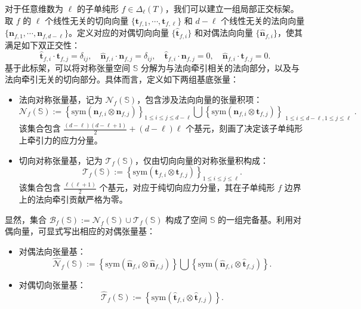 对于任意维数为 $\ell$ 的子单纯形 $f \in \Delta_{\ell}(T)$，我们可以建立一组局部正交标架。取 $f$ 的 $\ell$ 个线性无关的切向向量 $\{\boldsymbol{t}_{f,1}, \cdots, \boldsymbol{t}_{f,\ell}\}$ 和 $d-\ell$ 个线性无关的法向向量 $\{\boldsymbol{n}_{f,1}, \cdots, \boldsymbol{n}_{f,d-\ell}\}$。定义对应的对偶切向向量 $\{\hat{\boldsymbol{t}}_{f,i}\}$ 和对偶法向向量 $\{\hat{\boldsymbol{n}}_{f,i}\}$，使其满足如下双正交性：
\[
\hat{\boldsymbol{t}}_{f, i} \cdot \boldsymbol{t}_{f, j} = \delta_{ij}, \quad \hat{\boldsymbol{n}}_{f, i} \cdot \boldsymbol{n}_{f, j} = \delta_{ij}, \quad \hat{\boldsymbol{t}}_{f, i} \cdot \boldsymbol{n}_{f, j} = 0, \quad \hat{\boldsymbol{n}}_{f, i} \cdot \boldsymbol{t}_{f, j} = 0.
\]
基于此标架，可以将对称张量空间 $\mathbb{S}$ 分解为与法向牵引相关的法向部分，以及与法向牵引无关的切向部分。具体而言，定义如下两组基底张量：
\begin{itemize}
	\item 法向对称张量基，记为 $\mathcal{N}_f(\mathbb{S})$，包含涉及法向向量的张量积项：
	\[
	\mathcal{N}_f(\mathbb{S}) := \left\{ \mathrm{sym}(\boldsymbol{n}_{f, i} \otimes \boldsymbol{n}_{f, j}) \right\}_{1 \leq i \leq j \leq d-\ell} \bigcup \left\{ \mathrm{sym}(\boldsymbol{n}_{f, i} \otimes \boldsymbol{t}_{f, j}) \right\}_{\substack{1 \leq i \leq d-\ell,1 \leq j \leq \ell}}.
	\]
	该集合包含 $\frac{(d-\ell)(d-\ell+1)}{2} + (d-\ell)\ell$ 个基元，刻画了决定该子单纯形上牵引力的应力分量。
	
	\item 切向对称张量基，记为 $\mathcal{T}_f(\mathbb{S})$，仅由切向向量的对称张量积构成：
	\[
	\mathcal{T}_f(\mathbb{S}) := \left\{ \mathrm{sym}(\boldsymbol{t}_{f, i} \otimes \boldsymbol{t}_{f, j}) \right\}_{1 \leq i \leq j \leq \ell}.
	\]
	该集合包含 $\frac{\ell(\ell+1)}{2}$ 个基元，对应于纯切向应力分量，其在子单纯形 $f$ 边界上的法向牵引贡献严格为零。
\end{itemize}
显然，集合 $\mathcal{B}_f(\mathbb{S}) := \mathcal{N}_f(\mathbb{S}) \cup \mathcal{T}_f(\mathbb{S})$ 构成了空间 $\mathbb{S}$ 的一组完备基。利用对偶向量，可显式写出相应的对偶张量基：
\begin{itemize}
	\item 对偶法向张量基：
	\[
	\hat{\mathcal{N}}_f(\mathbb{S}) := \left\{ \mathrm{sym}(\hat{\boldsymbol{n}}_{f, i} \otimes \hat{\boldsymbol{n}}_{f, j}) \right\} \bigcup \left\{ \mathrm{sym}(\hat{\boldsymbol{n}}_{f, i} \otimes \hat{\boldsymbol{t}}_{f, j}) \right\}.
	\]
	
	\item 对偶切向张量基：
	\[
	\hat{\mathcal{T}}_f(\mathbb{S}) := \left\{ \mathrm{sym}(\hat{\boldsymbol{t}}_{f, i} \otimes \hat{\boldsymbol{t}}_{f, j}) \right\}.
	\]
\end{itemize}

